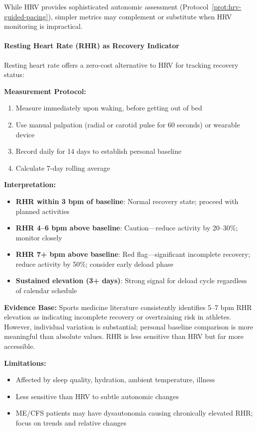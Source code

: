 While HRV provides sophisticated autonomic assessment (Protocol~\ref{prot:hrv-guided-pacing}), simpler metrics may complement or substitute when HRV monitoring is impractical.

\paragraph{Resting Heart Rate (RHR) as Recovery Indicator}

Resting heart rate offers a zero-cost alternative to HRV for tracking recovery status:

\begin{protocol}
\label{prot:rhr-monitoring}

\textbf{Measurement Protocol:}
\begin{enumerate}
    \item Measure immediately upon waking, before getting out of bed
    \item Use manual palpation (radial or carotid pulse for 60 seconds) or wearable device
    \item Record daily for 14 days to establish personal baseline
    \item Calculate 7-day rolling average
\end{enumerate}

\textbf{Interpretation:}
\begin{itemize}
    \item \textbf{RHR within 3 bpm of baseline}: Normal recovery state; proceed with planned activities
    \item \textbf{RHR 4--6 bpm above baseline}: Caution---reduce activity by 20--30\%; monitor closely
    \item \textbf{RHR 7+ bpm above baseline}: Red flag---significant incomplete recovery; reduce activity by 50\%; consider early deload phase
    \item \textbf{Sustained elevation (3+ days)}: Strong signal for deload cycle regardless of calendar schedule
\end{itemize}

\textbf{Evidence Base:}
Sports medicine literature consistently identifies 5--7 bpm RHR elevation as indicating incomplete recovery or overtraining risk in athletes. However, individual variation is substantial; personal baseline comparison is more meaningful than absolute values. RHR is less sensitive than HRV but far more accessible.

\textbf{Limitations:}
\begin{itemize}
    \item Affected by sleep quality, hydration, ambient temperature, illness
    \item Less sensitive than HRV to subtle autonomic changes
    \item ME/CFS patients may have dysautonomia causing chronically elevated RHR; focus on trends and relative changes
\end{itemize}
\end{protocol}

